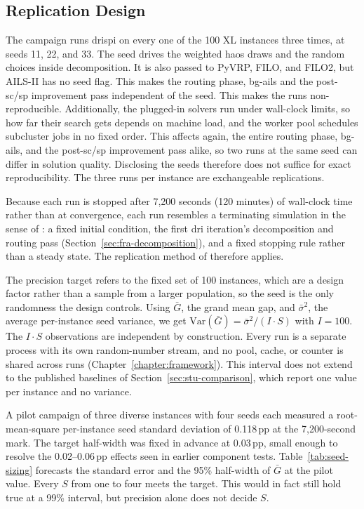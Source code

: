 \subsection{Replication Design}\label{sec:stu-repetitions}
The campaign runs \gls{drispi} on every one of the 100 XL instances three times, at
seeds 11, 22, and 33. The seed drives the weighted \gls{haos} draws and the random choices inside decomposition. It is also
passed to PyVRP, FILO, and FILO2, but AILS-II has no seed flag. This makes the routing phase, \gls{bg-ails} and the post-\gls{sc}/\gls{sp} improvement pass independent of the seed. This makes the runs non-reproducible. Additionally, the plugged-in solvers run under wall-clock limits, so how far their search gets depends on machine load, and the worker pool
schedules subcluster jobs in no fixed order. This affects again, the entire routing phase,
\gls{bg-ails}, and the post-\gls{sc}/\gls{sp} improvement pass alike, so two runs at the same seed
can differ in solution quality. Disclosing the seeds therefore does not suffice
for exact reproducibility. The three runs per instance are exchangeable replications.

Because each run is stopped after 7,200 seconds (120 minutes) of wall-clock time rather than at convergence, each run resembles a terminating simulation in the sense of \citet[p.~490]{lawSimulationModelingAnalysis2000}: a fixed initial condition, the first \gls{dri} iteration's decomposition and routing pass (Section~\ref{sec:fra-decomposition}), and a fixed stopping rule rather than a steady state. The replication method of \citet[p.~495]{lawSimulationModelingAnalysis2000} therefore applies.

The precision target refers to the fixed set of 100 instances, which are a design
factor \citep{queirogaXLInstancesCapacitated2026} rather than a sample from a larger
population, so the seed is the only randomness the design controls. Using
$\bar G$, the grand mean gap, and $\bar\sigma^2$, the average per-instance seed
variance, we get $\mathrm{Var}(\bar G) = \bar\sigma^2 / (I \cdot S)$ with
$I = 100$. The $I \cdot S$ observations are independent by construction. Every
run is a separate process with its own random-number stream, and no pool, cache,
or counter is shared across runs (Chapter~\ref{chapter:framework}). This interval does
not extend to the published baselines of Section~\ref{sec:stu-comparison}, which
report one value per instance and no variance.

A pilot campaign of three diverse instances with four seeds each measured a
root-mean-square per-instance seed standard deviation of 0.118\,pp at the
7{,}200-second mark. The target half-width was fixed in advance at 0.03\,pp, small
enough to resolve the 0.02--0.06\,pp effects seen in earlier component tests.
Table~\ref{tab:seed-sizing} forecasts the standard error and the 95\%
half-width of $\bar G$ at the pilot value. Every $S$ from one to four meets the
target. This would in fact still hold true at a 99\% interval, but precision alone does not decide $S$.

